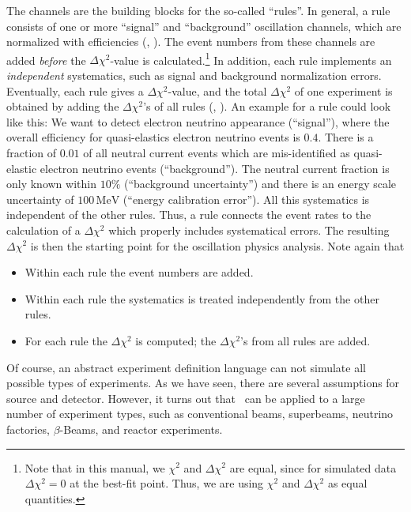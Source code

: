 The channels are the building blocks for the so-called ``rules''.
 In general, a rule consists of one or more ``signal'' and ``background'' oscillation channels, which are normalized with efficiencies
(\cf, ). The event numbers from these channels are added {\em before} the $\Delta \chi^2$-value is calculated.\footnote{Note that
in this manual, we $\chi^2$ and $\Delta \chi^2$ are equal, since
for simulated data $\Delta \chi^2 = 0$ at the best-fit point. Thus, we
are using $\chi^2$ and $\Delta \chi^2$ as equal quantities.} In addition, each rule implements an {\em independent} systematics, such as signal and background normalization errors. Eventually, each rule gives a $\Delta \chi^2$-value, and the total $\Delta \chi^2$ of one experiment is obtained by adding the $\Delta \chi^2$'s of all rules (\cf, ). 
 An example for a rule could look like this: We want to detect electron
  neutrino appearance (``signal''), where the overall efficiency for 
  quasi-elastics electron neutrino events is $0.4$. There is a fraction of 
  $0.01$ of all neutral current events which are mis-identified as 
  quasi-elastic electron neutrino events (``background''). The neutral 
  current fraction is only known within $10\%$ (``background uncertainty'') 
  and there is
an energy scale uncertainty of $100\,\mathrm{MeV}$ (``energy calibration error'').
All this systematics is independent of the other rules.  Thus, a rule connects the event rates to the calculation of a $\Delta \chi^2$ which properly includes systematical errors. The resulting $\Delta \chi^2$ is then the starting point for the oscillation physics analysis. Note again that
\begin{itemize}
\item
 Within each rule the event numbers are added.
\item
 Within each rule the systematics is treated independently from the other rules.
\item
 For each rule the $\Delta \chi^2$ is computed; the $\Delta \chi^2$'s from all rules are added.
\end{itemize}

Of course, an abstract experiment definition language can not simulate all possible types of experiments. As we have seen, there are several assumptions for source and detector. However, it turns out that \GLOBES\ can be applied to a large number of experiment types, such as conventional beams, superbeams, neutrino factories, $\beta$-Beams, and reactor experiments.

